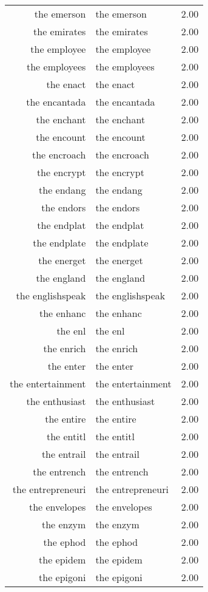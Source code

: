 \begin{table}[ht]
\begin{tabular}{rlr}
  the emerson & the emerson & 2.00 \\ 
  the emirates & the emirates & 2.00 \\ 
  the employee & the employee & 2.00 \\ 
  the employees & the employees & 2.00 \\ 
  the enact & the enact & 2.00 \\ 
  the encantada & the encantada & 2.00 \\ 
  the enchant & the enchant & 2.00 \\ 
  the encount & the encount & 2.00 \\ 
  the encroach & the encroach & 2.00 \\ 
  the encrypt & the encrypt & 2.00 \\ 
  the endang & the endang & 2.00 \\ 
  the endors & the endors & 2.00 \\ 
  the endplat & the endplat & 2.00 \\ 
  the endplate & the endplate & 2.00 \\ 
  the energet & the energet & 2.00 \\ 
  the england & the england & 2.00 \\ 
  the englishspeak & the englishspeak & 2.00 \\ 
  the enhanc & the enhanc & 2.00 \\ 
  the enl & the enl & 2.00 \\ 
  the enrich & the enrich & 2.00 \\ 
  the enter & the enter & 2.00 \\ 
  the entertainment & the entertainment & 2.00 \\ 
  the enthusiast & the enthusiast & 2.00 \\ 
  the entire & the entire & 2.00 \\ 
  the entitl & the entitl & 2.00 \\ 
  the entrail & the entrail & 2.00 \\ 
  the entrench & the entrench & 2.00 \\ 
  the entrepreneuri & the entrepreneuri & 2.00 \\ 
  the envelopes & the envelopes & 2.00 \\ 
  the enzym & the enzym & 2.00 \\ 
  the ephod & the ephod & 2.00 \\ 
  the epidem & the epidem & 2.00 \\ 
  the epigoni & the epigoni & 2.00 \\ 

\end{tabular}
\end{table}
